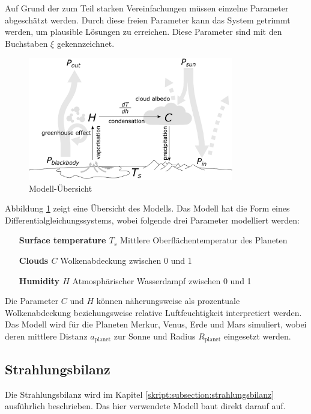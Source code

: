 \begin{refsection}
Auf Grund der zum Teil starken Vereinfachungen müssen einzelne Parameter abgeschätzt werden. Durch diese freien Parameter kann das System getrimmt werden, um plausible Lösungen zu erreichen. Diese Parameter sind mit den Buchstaben $\xi$ gekennzeichnet.

\begin{figure}
	\centering
	\includegraphics[width=0.8\textwidth]{planeten/Pictures/Model.eps}
	\caption{Modell-Übersicht}
	\label{planeten:model}
\end{figure}
Abbildung \ref{planeten:model} zeigt eine Übersicht des Modells.
Das Modell hat die Form eines Differentialgleichungssystems, wobei folgende drei Parameter modelliert werden:
\begin{itemize}[labelindent=1.8cm,labelsep=0.5cm]
\item [\textbf{Surface temperature $T_s$}]
Mittlere Oberflächentemperatur des Planeten
\item [\textbf{Clouds $C$}]
Wolkenabdeckung zwischen 0 und 1
\item [\textbf{Humidity $H$}]
Atmosphärischer Wasserdampf zwischen 0 und 1
\end{itemize}
Die Parameter $C$ und $H$ können näherungsweise als prozentuale Wolkenabdeckung beziehungsweise relative Luftfeuchtigkeit  interpretiert werden.
Das Modell wird für die Planeten Merkur, Venus, Erde und Mars simuliert, wobei deren mittlere Distanz $a_\text{planet}$ zur Sonne und Radius $R_\text{planet}$ eingesetzt werden.

\subsection{Strahlungsbilanz}
%
Die Strahlungsbilanz wird im Kapitel \ref{skript:subsection:strahlungsbilanz} ausführlich beschrieben. Das hier verwendete Modell baut direkt darauf auf.


\end{refsection}
